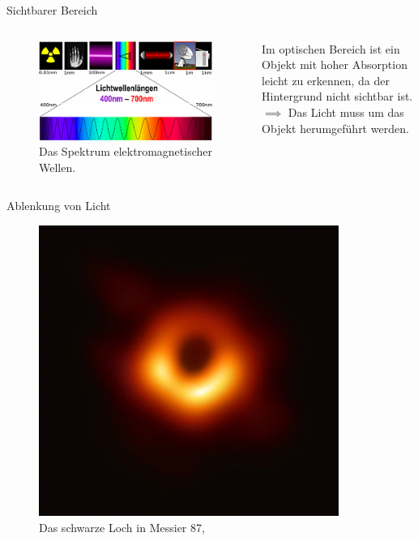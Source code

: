 \begin{frame}{Sichtbarer Bereich}
  \begin{columns}
    \begin{column}{0.48\textwidth}
      \begin{figure}
        \centering
        \includegraphics[width=\textwidth]{images/wellenbereich.png}
        \caption{Das Spektrum elektromagnetischer Wellen.}
      \end{figure}
    \end{column}
    \begin{column}{0.48\textwidth}
      Im optischen Bereich ist ein Objekt mit hoher Absorption leicht zu erkennen,
      da der Hintergrund nicht sichtbar ist. \\
      $\implies$ Das Licht muss um das Objekt herumgef\"uhrt werden.
    \end{column}
  \end{columns}
\end{frame}

\begin{frame}{Ablenkung von Licht}
  \begin{figure}
    \caption{Das schwarze Loch in Messier 87, \cite{m87}}
    \includegraphics[height=0.8\textheight]{images/m87.jpg}
  \end{figure}
\end{frame}
